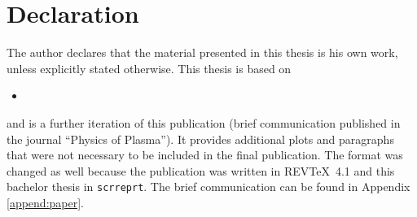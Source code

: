 \chapter*{Declaration}
\label{chap:declaration}

The author declares that the material presented in this thesis is his own work, unless explicitly stated otherwise. This thesis is based on
\bigskip
\begin{itemize}
    \item [] 
\end{itemize}
\bigskip
and is a further iteration of this publication (brief communication published in the journal \enquote{Physics of Plasma}). It provides additional plots and paragraphs that were not necessary to be included in the final publication. The format was changed as well because the publication was written in REV\TeX~4.1 and this bachelor thesis in \texttt{scrreprt}. The brief communication can be found in Appendix \ref{append:paper}.